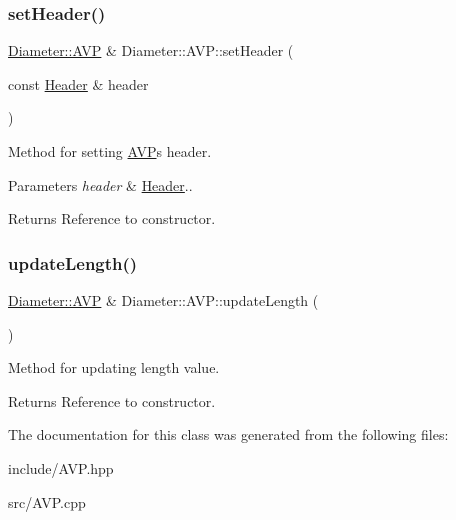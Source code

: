 \subsubsection{\texorpdfstring{set\+Header()}{setHeader()}}
{\footnotesize\ttfamily \hyperlink{classDiameter_1_1AVP}{Diameter\+::\+A\+VP} \& Diameter\+::\+A\+V\+P\+::set\+Header (\begin{DoxyParamCaption}\item[{const \hyperlink{classDiameter_1_1AVP_1_1Header}{Header} \&}]{header }\end{DoxyParamCaption})}



Method for setting \hyperlink{classDiameter_1_1AVP}{A\+VP}\textquotesingle{}s header. 


\begin{DoxyParams}{Parameters}
{\em header} & \hyperlink{classDiameter_1_1AVP_1_1Header}{Header}.. \\
\hline
\end{DoxyParams}
\begin{DoxyReturn}{Returns}
Reference to constructor. 
\end{DoxyReturn}
\mbox{\label{classDiameter_1_1AVP_abb3ae19edc433ec2832e4cf2d72c425d}} 
\subsubsection{\texorpdfstring{update\+Length()}{updateLength()}}
{\footnotesize\ttfamily \hyperlink{classDiameter_1_1AVP}{Diameter\+::\+A\+VP} \& Diameter\+::\+A\+V\+P\+::update\+Length (\begin{DoxyParamCaption}{ }\end{DoxyParamCaption})}



Method for updating length value. 

\begin{DoxyReturn}{Returns}
Reference to constructor. 
\end{DoxyReturn}


The documentation for this class was generated from the following files\+:\begin{DoxyCompactItemize}
\item 
include/A\+V\+P.\+hpp\item 
src/A\+V\+P.\+cpp\end{DoxyCompactItemize}
